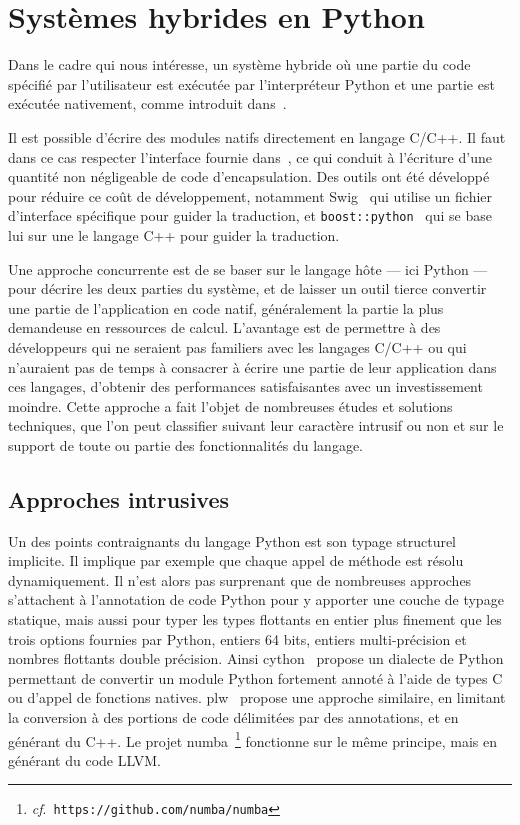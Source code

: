 \documentclass[renpar]{compas2013}
\begin{document}
\section{Systèmes hybrides en Python}\label{sec:python-hybrid}

Dans le cadre qui nous intéresse, un système hybride où une partie du code
spécifié par l'utilisateur est exécutée par l'interpréteur Python et une
partie est exécutée nativement, comme introduit dans~\cite{dongara2007}.

Il est possible d'écrire des modules natifs directement en langage C/C++.
Il faut dans ce cas respecter l'interface fournie dans~\cite{pythoncapi},
ce qui conduit à l'écriture d'une quantité non négligeable de code
d'encapsulation. Des outils ont été développé pour réduire ce coût de
développement, notamment Swig~\cite{swig2003} qui utilise un fichier
d'interface spécifique pour guider la traduction, et
\texttt{boost::python}~\cite{boostpython2007} qui se base lui sur une
le langage C++ pour guider la traduction.

Une approche concurrente est de se baser sur le langage hôte --- ici
Python --- pour décrire les deux parties du système, et de laisser un
outil tierce convertir une partie de l'application en code natif,
généralement la partie la plus demandeuse en ressources de calcul.
L'avantage est de permettre à des développeurs qui ne seraient pas
familiers avec les langages C/C++ ou qui n'auraient pas de temps à
consacrer à écrire une partie de leur application dans ces langages,
d'obtenir des performances satisfaisantes avec un investissement moindre.
Cette approche a fait l'objet de nombreuses études et solutions
techniques, que l'on peut classifier suivant leur caractère intrusif ou
non et sur le support de toute ou partie des fonctionnalités du langage.

\subsection{Approches intrusives}

Un des points contraignants du langage Python est son typage structurel
implicite. Il implique par exemple que chaque appel de méthode est résolu
dynamiquement. Il n'est alors pas surprenant que de nombreuses approches
s'attachent à l'annotation de code Python pour y apporter une couche de
typage statique, mais aussi pour typer les types flottants en entier plus
finement que les trois options fournies par Python, entiers 64 bits,
entiers multi-précision et nombres flottants double précision. Ainsi
cython~\cite{cython2010} propose un dialecte de Python permettant de
convertir un module Python fortement annoté à l'aide de types C ou d'appel
de fonctions natives. plw~\cite{dongara2007} propose une approche
similaire, en limitant la conversion à des portions de code délimitées par
des annotations, et en générant du C++. Le projet
numba~\footnote{\emph{cf}.\ \texttt{https://github.com/numba/numba}}
fonctionne sur le même principe, mais en générant du code LLVM.
\end{document}

